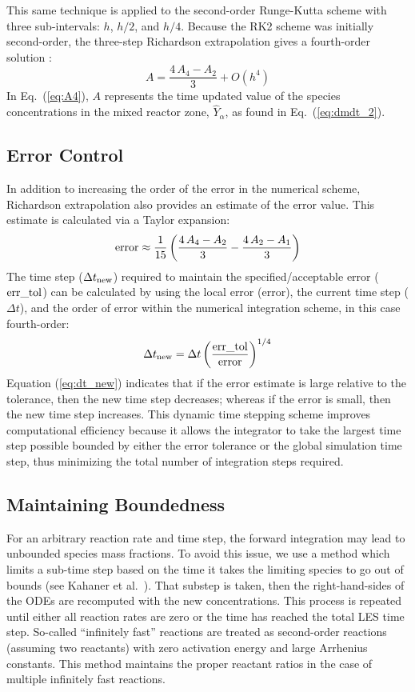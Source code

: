 This same technique is applied to the second-order Runge-Kutta scheme with three sub-intervals: $h$, $h/2$, and $h/4$. Because the RK2 scheme was initially second-order, the three-step Richardson extrapolation gives a fourth-order solution \cite{Moin:2001}:
\begin{equation}\label{eq:A4}
A=\frac{4\,A_4-A_2}{3}  + \mathit{O}(h^4)
\end{equation}
In Eq.~(\ref{eq:A4}), $A$ represents the time updated value of the species concentrations in the mixed reactor zone, $\hat{Y}_{\alpha}$, as found in Eq.~(\ref{eq:dmdt_2}).

\subsection*{Error Control}

In addition to increasing the order of the error in the numerical scheme, Richardson extrapolation also provides an estimate of the error value. This estimate is calculated via a Taylor expansion:
\begin{equation}\label{eq:error}
\hbox{error} \approx \frac{1}{15}\left(\frac{4\,A_4-A_2}{3} - \frac{4\,A_2-A_1}{3}\right)
\end{equation}
The time step ($\Delta t_{\rm new}$) required to maintain the specified/acceptable error ($\rm err\_tol$) can be calculated by using the local error (error), the current time step ($\Delta t$), and the order of error within the numerical integration scheme, in this case fourth-order:
\begin{equation}\label{eq:dt_new}
\Delta t_{\rm new}=\Delta t \left(\frac{\rm err\_tol}{\rm error}\right)^{1/4}
\end{equation}
Equation (\ref{eq:dt_new}) indicates that if the error estimate is large relative to the tolerance, then the new time step decreases; whereas if the error is small, then the new time step increases. This dynamic time stepping scheme improves computational efficiency because it allows the integrator to take the largest time step possible bounded by either the error tolerance or the global simulation time step, thus minimizing the total number of integration steps required.

\subsection*{Maintaining Boundedness}

For an arbitrary reaction rate and time step, the forward integration may lead to unbounded species mass fractions.  To avoid this issue, we use a method which limits a sub-time step based on the time it takes the limiting species to go out of bounds (see Kahaner et al.~\cite{Kahaner:1989}).  That substep is taken, then the right-hand-sides of the ODEs are recomputed with the new concentrations.  This process is repeated until either all reaction rates are zero or the time has reached the total LES time step.  So-called ``infinitely fast'' reactions are treated as second-order reactions (assuming two reactants) with zero activation energy and large Arrhenius constants.  This method maintains the proper reactant ratios in the case of multiple infinitely fast reactions.


